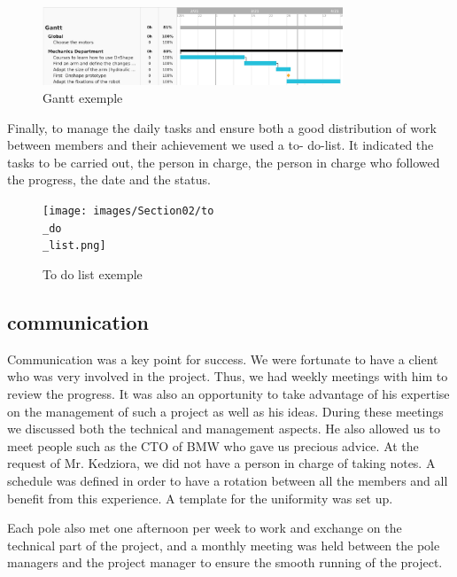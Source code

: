 \begin{figure}[ht]
    \centering
    \includegraphics[width=0.8\textwidth]{images/Section02/gantt.png}
    \caption{Gantt exemple}
    \label{fig:mesh5}
\end{figure}
\FloatBarrier

\bigbreak
Finally, to manage the daily tasks and ensure both a good distribution of work between members and their achievement we used a to- do-list. It indicated the tasks to be carried out, the person in charge, the person in charge who followed the progress, the date and the status. 

\begin{figure}[ht]
    \centering
    \texttt{[image: images/Section02/to\\\_do\\\_list.png]}
    \caption{To do list exemple}
    \label{fig:mesh6}
\end{figure}

\subsection{communication}

\hspace{\parindent} Communication was a key point for success. We were fortunate to have a client who was very involved in the project. Thus, we had weekly meetings with him to review the progress. It was also an opportunity to take advantage of his expertise on the management of such a project as well as his ideas. During these meetings we discussed both the technical and management aspects. He also allowed us to meet people such as the CTO of BMW who gave us precious advice. At the request of Mr. Kedziora, we did not have a person in charge of taking notes. A schedule was defined in order to have a rotation between all the members and all benefit from this experience. A template for the uniformity was set up. 

\bigbreak
Each pole also met one afternoon per week to work and exchange on the technical part of the project, and a monthly meeting was held between the pole managers and the project manager to ensure the smooth running of the project. 

